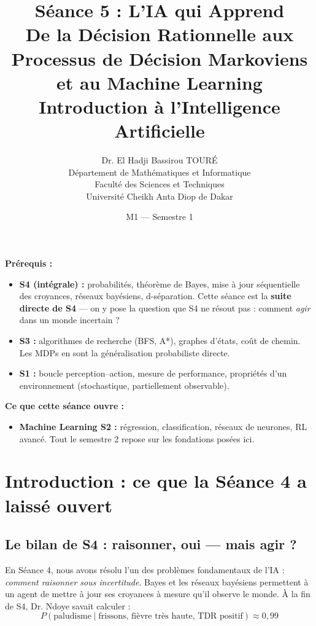 \documentclass[11pt,a4paper]{article}
\title{\textbf{Séance 5 : L'IA qui Apprend}\\
\large De la Décision Rationnelle aux Processus de Décision Markoviens\\
et au Machine Learning\\[0.5cm]
\normalsize Introduction à l'Intelligence Artificielle}
\author{Dr. El Hadji Bassirou TOURÉ\\
Département de Mathématiques et Informatique\\
Faculté des Sciences et Techniques\\
Université Cheikh Anta Diop de Dakar}
\date{M1 --- Semestre 1}
\begin{document}
\maketitle

\begin{prereqbox}
\textbf{Prérequis :}
\begin{itemize}[nosep]
    \item \textbf{S4 (intégrale) :} probabilités, théorème de Bayes, mise à jour séquentielle des croyances, réseaux bayésiens, d-séparation. Cette séance est la \textbf{suite directe de S4} --- on y pose la question que S4 ne résout pas : comment \textit{agir} dans un monde incertain ?
    \item \textbf{S3 :} algorithmes de recherche (BFS, A*), graphes d'états, coût de chemin. Les MDPs en sont la généralisation probabiliste directe.
    \item \textbf{S1 :} boucle perception--action, mesure de performance, propriétés d'un environnement (stochastique, partiellement observable).
\end{itemize}
\textbf{Ce que cette séance ouvre :}
\begin{itemize}[nosep]
    \item \textbf{Machine Learning S2 :} régression, classification, réseaux de neurones, RL avancé. Tout le semestre 2 repose sur les fondations posées ici.
\end{itemize}
\end{prereqbox}

\vspace{0.4cm}
\tableofcontents
\newpage

\section{Introduction : ce que la Séance 4 a laissé ouvert}

\subsection{Le bilan de S4 : raisonner, oui --- mais agir ?}

En Séance 4, nous avons résolu l'un des problèmes fondamentaux de l'IA : \textit{comment raisonner sous incertitude}. Bayes et les réseaux bayésiens permettent à un agent de mettre à jour ses croyances à mesure qu'il observe le monde. À la fin de S4, Dr. Ndoye savait calculer :
$$P(\text{paludisme} \mid \text{frissons, fièvre très haute, TDR positif}) \approx 0{,}99$$
\end{document}
